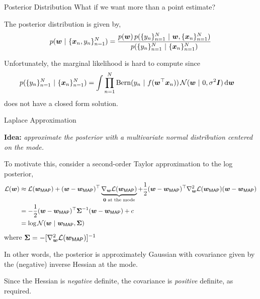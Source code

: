 \documentclass[aspectratio=169]{beamer}
\begin{document}
\begin{frame}{Posterior Distribution}
What if we want more than a point estimate? 

The posterior distribution is given by,
\begin{align}
    p(\boldsymbol{w} ~\vert~ \{\boldsymbol{x}_n, y_n\}_{n=1}^N) &= \frac{p(\boldsymbol{w}) \, p(\{y_n\}_{n=1}^N ~\vert~ \boldsymbol{w}, \{\boldsymbol{x}_n\}_{n=1}^N)}{p(\{y_n\}_{n=1}^N ~\vert~ \{\boldsymbol{x}_n\}_{n=1}^N)} \\
\end{align}

Unfortunately, the marginal likelihood is hard to compute since 
\begin{align}
    p(\{y_n\}_{n=1}^N ~\vert~ \{\boldsymbol{x}_n\}_{n=1}^N) &=
    \int \prod_{n=1}^N \mathrm{Bern}(y_n ~\vert~ f(\boldsymbol{w}^\top \boldsymbol{x}_n)) \, \mathcal{N}(\boldsymbol{w} ~\vert~ 0, \sigma^2 \boldsymbol{I}) \mathop{}\!\mathrm{d} \boldsymbol{w}
\end{align}
does not have a closed form solution.

\end{frame}

\begin{frame}{Laplace Approximation}

\textbf{Idea: } \textit{approximate the posterior with a multivariate normal distribution centered on the mode.}

To motivate this, consider a second-order Taylor approximation to the log posterior,
\begin{align}
    \mathcal{L}(\boldsymbol{w}) &\approx \mathcal{L}(\boldsymbol{w}_{\mathsf{MAP}}) + (\boldsymbol{w} - \boldsymbol{w}_{\mathsf{MAP}})^\top \underbrace{\nabla_{\boldsymbol{w}} \mathcal{L}(\boldsymbol{w}_{\mathsf{MAP}})}_{\boldsymbol{0} \text{ at the mode}} + \frac{1}{2} (\boldsymbol{w} - \boldsymbol{w}_{\mathsf{MAP}})^\top \nabla^2_{\boldsymbol{w}} \mathcal{L}(\boldsymbol{w}_{\mathsf{MAP}}) (\boldsymbol{w} - \boldsymbol{w}_{\mathsf{MAP}}) \\
    &= -\frac{1}{2} (\boldsymbol{w} - \boldsymbol{w}_{\mathsf{MAP}})^\top \boldsymbol{\Sigma}^{-1} (\boldsymbol{w} - \boldsymbol{w}_{\mathsf{MAP}}) + c \\
    &= \log \mathcal{N}(\boldsymbol{w} ~\vert~ \boldsymbol{w}_{\mathsf{MAP}}, \boldsymbol{\Sigma}) 
\end{align}
where $\boldsymbol{\Sigma} = - [\nabla^2_{\boldsymbol{w}} \mathcal{L}(\boldsymbol{w}_{\mathsf{MAP}})]^{-1} $

In other words, the posterior is approximately Gaussian with covariance given by the (negative) inverse Hessian at the mode.

Since the Hessian is \textit{negative} definite, the covariance is \emph{positive} definite, as required.
\end{frame}
\end{document}
